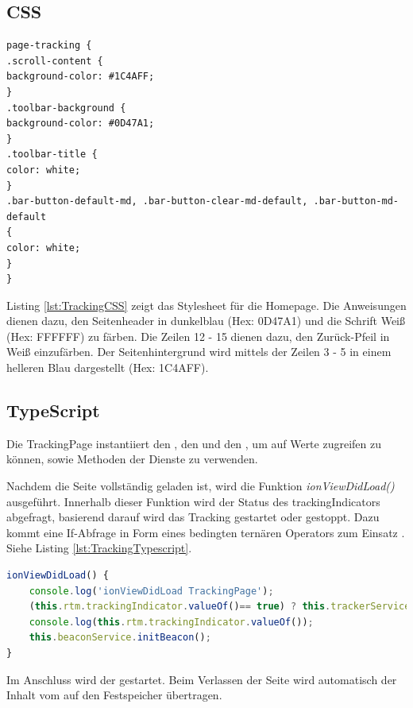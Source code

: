 \subsection{CSS}

\begin{lstlisting}[float, language=HTML5, caption=Stylesheet für die TrackingPage , label=lst:TrackingCSS]
page-tracking {
.scroll-content {
background-color: #1C4AFF;
}
.toolbar-background {
background-color: #0D47A1;
}
.toolbar-title {
color: white;
}
.bar-button-default-md, .bar-button-clear-md-default, .bar-button-md-default
{
color: white;
}
}
\end{lstlisting}

Listing \ref{lst:TrackingCSS} zeigt das Stylesheet für die Homepage. Die Anweisungen dienen dazu, den Seitenheader in dunkelblau (Hex: 0D47A1) und die Schrift Weiß (Hex: FFFFFF) zu färben. Die Zeilen 12 - 15 dienen dazu, den \glqq Zurück\grqq{}-Pfeil in Weiß einzufärben. Der Seitenhintergrund wird mittels der Zeilen 3 - 5 in einem helleren Blau dargestellt (Hex: 1C4AFF).

\subsection{TypeScript}

Die TrackingPage instantiiert den , den  und den , um auf Werte zugreifen zu können, sowie Methoden der Dienste zu verwenden.


Nachdem die Seite vollständig geladen ist, wird die Funktion \emph{ionViewDidLoad()} ausgeführt. Innerhalb dieser Funktion wird der Status des \glqq trackingIndicators \grqq abgefragt, basierend darauf wird das Tracking gestartet oder gestoppt. Dazu kommt eine If-Abfrage in Form eines bedingten ternären Operators zum Einsatz \cite{TernärerOperator}.  Siehe Listing \ref{lst:TrackingTypescript}. 

\begin{lstlisting}[float, language=JavaScript, caption= ionViewDidLoad()-Methode der TrackingPage , label=lst:TrackingTypescript]
 ionViewDidLoad() {
    console.log('ionViewDidLoad TrackingPage');
    (this.rtm.trackingIndicator.valueOf()== true) ? this.trackerService.startTracking() : this.trackerService.stopTracking();
    console.log(this.rtm.trackingIndicator.valueOf());
    this.beaconService.initBeacon();
}
\end{lstlisting}

Im Anschluss wird der  gestartet. Beim Verlassen der Seite wird automatisch der Inhalt vom  auf den Festspeicher übertragen.

